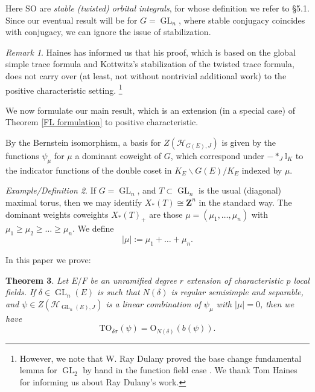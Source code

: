 \documentclass[reqno]{amsart}
\numberwithin{equation}{section}
\newcommand{\tony}[1]{{\color{blue} \sf
    $\spadesuit\spadesuit\spadesuit$ TONY: [#1]}}
\newcommand{\Z}{\mathbf{Z}}
\newcommand{\mbb}[1]{\mathbb{#1}}
\newcommand{\Cal}[1]{\mathcal{#1}}
\newcommand{\mrm}[1]{\mathrm{#1}}
\DeclareMathOperator{\GL}{GL}
\newtheorem{thm}{Theorem}[section]
\theoremstyle{remark}
\newtheorem{remark}[thm]{Remark}
\newtheorem{exdef}[thm]{Example/Definition}
\numberwithin{equation}{section}
\begin{document}
Here $\mrm{SO}$ are \emph{stable (twisted) orbital integrals}, for whose definition we refer to \cite{Haines09} \S 5.1. Since our eventual result will be for $G = \GL_n$, where stable conjugacy coincides with conjugacy, we can ignore the issue of stabilization.

\begin{remark}
Haines has informed us that his proof, which is based on the global simple trace formula and Kottwitz's stabilization of the twisted trace formula, does not carry over (at least, not without nontrivial additional work) to the positive characteristic setting. \footnote{However, we note that W. Ray Dulany proved the base change fundamental lemma for $\GL_2$ by hand in the function field case \cite{RD10}. We thank Tom Haines for informing us about Ray Dulany's work.}	
\end{remark}

 We now formulate our main result, which is an extension (in a special case) of Theorem \ref{FL formulation} to positive characteristic. 
	
By the Bernstein isomorphism, a basis for $ Z(\Cal{H}_{G(E),J})$ is given by the functions $\psi_{\mu}$ for $\mu$ a dominant coweight of $G$, which correspond under $- * _J \mbb{I}_K$ to the indicator functions of the double coset in $K_E \backslash G(E)/K_E$ indexed by $\mu$. 

\begin{exdef} If $G = \GL_n$, and  $T \subset \GL_n$ is the usual (diagonal) maximal torus, then we may identify $ X_*(T) \cong \Z^n$ in the standard way. The dominant weights coweights $X_*(T)_+$ are those $\mu = (\mu_1,\ldots, \mu_n) $ with $\mu_1 \geq \mu_2 \geq \ldots  \geq \mu_n$. We define
\[
|\mu| := \mu_1  + \ldots + \mu_n.
\]
\end{exdef}

In this paper we prove: 	

\begin{thm}\label{main}
Let $E/F$ be an unramified degree $r$ extension of characteristic $p$ local fields. If $\delta \in \GL_n(E)$ is such that $N(\delta)$ is regular semisimple and separable, and $\psi \in Z(\Cal{H}_{\GL_n(E),J})$ is a linear combination of $\psi_{\mu}$ with $|\mu| = 0$, then we have
\[
  \mrm{TO}_{\delta \sigma}(\psi) = \mrm{O}_{N(\delta)} (b(\psi)).
\]
\end{thm}

\end{document}
